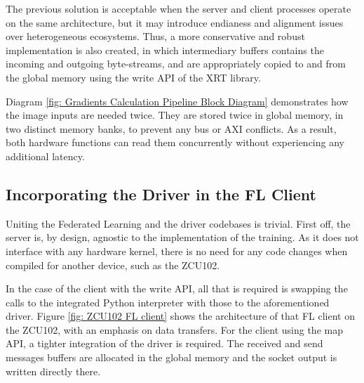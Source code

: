 The previous solution is acceptable when the server and client processes operate on the same architecture, but it may introduce endianess and alignment issues over heterogeneous ecosystems. Thus, a more conservative and robust implementation is also created, in which intermediary buffers contains the incoming and outgoing byte-streams, and are appropriately copied to and from the global memory using the write API of the XRT library. %

Diagram \ref{fig: Gradients Calculation Pipeline Block Diagram} demonstrates how the image inputs are needed twice. They are stored twice in global memory, in two distinct memory banks, to prevent any bus or AXI conflicts. As a result, both hardware functions can read them concurrently without experiencing any additional latency. %

\subsection{Incorporating the Driver in the FL Client}
Uniting the Federated Learning and the driver codebases is trivial. First off, the server is, by design, agnostic to the implementation of the training. As it does not interface with any hardware kernel, there is no need for any code changes when compiled for another device, such as the ZCU102.

In the case of the client with the write API, all that is required is swapping the calls to the integrated Python interpreter with those to the aforementioned driver. Figure \ref{fig: ZCU102 FL client} shows the architecture of that FL client on the ZCU102, with an emphasis on data transfers. For the client using the map API, a tighter integration of the driver is required. The received and send messages buffers are allocated in the global memory and the socket output is written directly there. 
